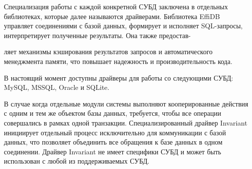 \begin{multicols}{2}
Специализация работы с каждой конкретной СУБД заключена в отдельных библиотеках, 
которые далее называются драйверами. Библиотека\linebreak 
\mbox{EffiDB} управ\-ля\-ет соединениями с базой данных,\linebreak 
формирует и исполняет SQL-за\-про\-сы, интерпретирует полученные результаты. Она 
также пред\-остав-\linebreak\vspace*{-12pt}
\pagebreak

\noindent
ля\-ет механизмы кэширования результатов запросов и автоматического 
менеджмента памяти, что повышает надежность и производительность кода.

В настоящий момент доступны драйверы для работы со следующими СУБД: MySQL, 
MSSQL, Oracle и SQLite.

В случае когда отдельные модули системы выполняют кооперированные действия с 
одним и тем же объектом базы данных, требуется, чтобы все операции совершались в 
рамках одной транзакции. Специализированный драйвер Invariant инициирует отдельный 
процесс исключительно для коммуникации с базой данных, что позволяет объединить все 
обращения к базе данных в одном соединении. 
Драйвер Invariant не имеет специфики СУБД и 
может быть использован с любой из поддерживаемых СУБД.


\end{multicols}
